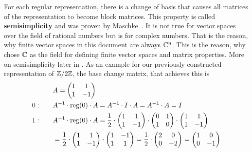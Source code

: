 For each regular representation, there is a change of basis that causes all matrices of the representation to become block matrices.
This property is called \textbf{semisimplicity} and was proven by Maschke~\cite{maschke1899}.
It is not true for vector spaces over the field of rational numbers but is for complex numbers.
That is the reason, why finite vector spaces in this document are always $\mathbb{C}^n$.
This is the reason, why chose $\mathbb{C}$ as the field for defining finite vector spaces and matrix properties.
More on semisimplicity later in .
As an example for our previously constructed representation of $\mathbb{Z}/2\mathbb{Z}$, the base change matrix, that achieves this is
\begin{align*}
    & A = \begin{pmatrix}
        1 & 1 \\
        1 & -1
    \end{pmatrix} \\
    0: \qquad & A^{-1} \cdot \operatorname{reg}(0) \cdot A = A^{-1} \cdot I \cdot A = A^{-1} \cdot A = I \\
    1: \qquad & A^{-1} \cdot \operatorname{reg}(0) \cdot A = \frac{1}{2} \cdot \begin{pmatrix}
        1 & 1 \\
        1 & -1
    \end{pmatrix} \cdot \begin{pmatrix}
        0 & 1 \\
        1 & 0
    \end{pmatrix} \cdot \begin{pmatrix}
        1 & 1 \\
        1 & -1
    \end{pmatrix} \\
    & = \frac{1}{2} \cdot \begin{pmatrix}
        1 & 1 \\
        1 & -1
    \end{pmatrix} \cdot \begin{pmatrix}
        1 & -1 \\
        1 & 1
    \end{pmatrix} = \frac{1}{2} \cdot \begin{pmatrix}
        2 & 0 \\
        0 & -2
    \end{pmatrix} = \begin{pmatrix}
        1 & 0 \\
        0 & -1
    \end{pmatrix}
\end{align*}
